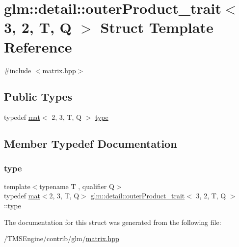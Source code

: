 \hypertarget{structglm_1_1detail_1_1outer_product__trait_3_013_00_012_00_01_t_00_01_q_01_4}{}\section{glm\+:\+:detail\+:\+:outer\+Product\+\_\+trait$<$ 3, 2, T, Q $>$ Struct Template Reference}
\label{structglm_1_1detail_1_1outer_product__trait_3_013_00_012_00_01_t_00_01_q_01_4}


{\ttfamily \#include $<$matrix.\+hpp$>$}

\subsection*{Public Types}
\begin{DoxyCompactItemize}
\item 
typedef \hyperlink{structglm_1_1mat}{mat}$<$ 2, 3, T, Q $>$ \hyperlink{structglm_1_1detail_1_1outer_product__trait_3_013_00_012_00_01_t_00_01_q_01_4_a9513a6759022bd799945791e82f882dd}{type}
\end{DoxyCompactItemize}


\subsection{Member Typedef Documentation}
\mbox{\label{structglm_1_1detail_1_1outer_product__trait_3_013_00_012_00_01_t_00_01_q_01_4_a9513a6759022bd799945791e82f882dd}} 
\subsubsection{\texorpdfstring{type}{type}}
{\footnotesize\ttfamily template$<$typename T , qualifier Q$>$ \\
typedef \hyperlink{structglm_1_1mat}{mat}$<$2, 3, T, Q$>$ \hyperlink{structglm_1_1detail_1_1outer_product__trait}{glm\+::detail\+::outer\+Product\+\_\+trait}$<$ 3, 2, T, Q $>$\+::\hyperlink{structglm_1_1detail_1_1outer_product__trait_3_013_00_012_00_01_t_00_01_q_01_4_a9513a6759022bd799945791e82f882dd}{type}}



The documentation for this struct was generated from the following file\+:\begin{DoxyCompactItemize}
\item 
/\+T\+M\+S\+Engine/contrib/glm/\hyperlink{matrix_8hpp}{matrix.\+hpp}\end{DoxyCompactItemize}

